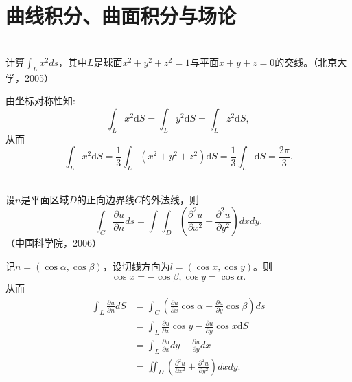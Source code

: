 \section{曲线积分、曲面积分与场论}  
  
  \begin{exercise}
  \hfill\\
  计算$\int_Lx^2ds$，其中$L$是球面$x^2+y^2+z^2=1$与平面$x+y+z=0$的交线。（北京大学，2005）
   
  
   由坐标对称性知:
  $$\int_Lx^2\mathrm{d}S=\int_Ly^2\mathrm{d}S=\int_Lz^2\mathrm{d}S,$$
  从而$$\int_Lx^2\mathrm{d}S=\frac{1}{3}\int_L(x^2+y^2+z^2)\mathrm{d}S=\frac{1}{3}\int_L\mathrm{d}S=\frac{2\pi}{3}.$$
 
  \end{exercise}
  \begin{exercise}
  \hfill\\
   设$n$是平面区域$D$的正向边界线$C$的外法线，则$$\int_C\frac{\partial u}{\partial n}ds=\int\int_D(\frac{\partial^2u}{\partial x^2}+\frac{\partial^2u}{\partial y^2})dxdy.$$（中国科学院，2006） 
  
记$n=(\cos\alpha,\cos\beta)$，设切线方向为$l=(\cos x,\cos y)$。则
$$\cos x=-\cos\beta,\cos y=\cos\alpha.$$
从而
\begin{align*}
\int_L\frac{\partial u}{\partial n}dS&=\int_C(\frac{\partial u}{\partial x}\cos\alpha+\frac{\partial u}{\partial y}\cos\beta)ds\\
&=\int_L\frac{\partial u}{\partial x}\cos y-\frac{\partial u}{\partial y}\cos x\mathrm{d}S\\
&=\int_L\frac{\partial u}{\partial x}dy-\frac{\partial u}{\partial y}dx\\
&=\iint_D(\frac{\partial^2u}{\partial x^2}+\frac{\partial^2u}{\partial y^2})dxdy.\\
\end{align*}  
  \end{exercise}

